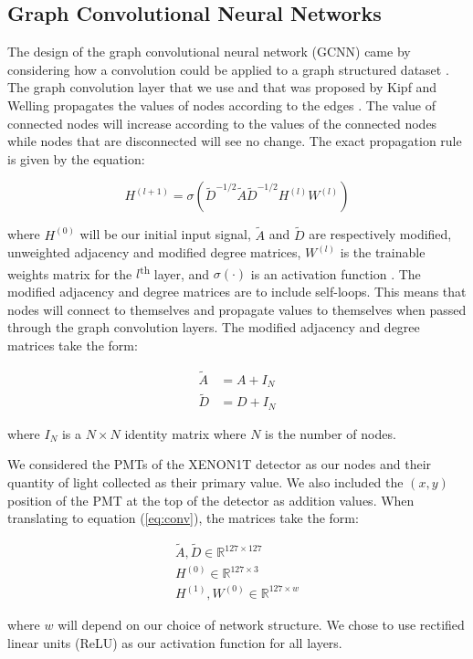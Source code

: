 \subsection{Graph Convolutional Neural Networks}
The design of the graph convolutional neural network (GCNN) came by considering how a convolution could be applied to a graph structured dataset \cite{GCNN_Kipf}.
The graph convolution layer that we use and that was proposed by Kipf and Welling propagates the values of nodes according to the edges \cite{GCNN_Kipf}.
The value of connected nodes will increase according to the values of the connected nodes while nodes that are disconnected will see no change.
The exact propagation rule is given by the equation:
\begin{linenomath}\begin{equation}\label{eq:conv}
H^{(l+1)} = \sigma\left( \tilde{D}^{-1/2} \tilde{A} \tilde{D}^{-1/2} H^{(l)} W^{(l)} \right)
\end{equation}\end{linenomath}
where $H^{(0)}$ will be our initial input signal, $\tilde{A}$ and $\tilde{D}$ are respectively modified, unweighted adjacency and modified degree matrices, $W^{(l)}$ is the trainable weights matrix for the $l$\textsuperscript{th} layer, and $\sigma(\cdot)$ is an activation function \cite{GCNN_Kipf}.
The modified adjacency and degree matrices are to include self-loops.
This means that nodes will connect to themselves and propagate values to themselves when passed through the graph convolution layers.
The modified adjacency and degree matrices take the form:
\begin{linenomath}\begin{align*}
	\tilde{A} &= A + I_{N} \\
	\tilde{D} &= D + I_{N}
\end{align*}\end{linenomath}
where $I_{N}$ is a $N \times N$ identity matrix where $N$ is the number of nodes.

\par We considered the PMTs of the XENON1T detector as our nodes and their quantity of light collected as their primary value.
We also included the $(x,y)$ position of the PMT at the top of the detector as addition values.
When translating to equation (\ref{eq:conv}), the matrices take the form:
\begin{linenomath}\begin{align*}
	\tilde{A}, \tilde{D} \in \mathbb{R}^{127 \times 127} \\
	H^{(0)} \in \mathbb{R}^{127 \times 3} \\
	H^{(1)}, W^{(0)} \in \mathbb{R}^{127 \times w}
\end{align*}\end{linenomath}
where $w$ will depend on our choice of network structure.
We chose to use rectified linear units (ReLU) as our activation function for all layers.

